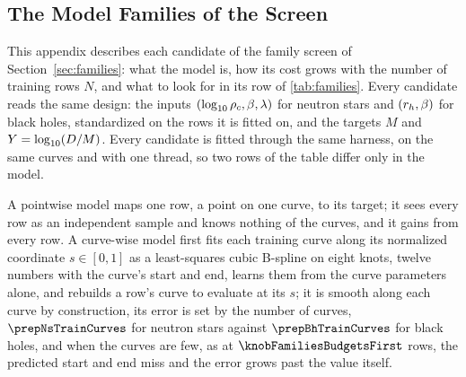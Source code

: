 \subsection{The Model Families of the Screen}
\label{app:families}

This appendix describes each candidate of the family screen of Section~\ref{sec:families}: what the model is, how its cost grows with the number of training rows $N$, and what to look for in its row of \cref{tab:families}. Every candidate reads the same design: the inputs $(\log_{10}\rho_c, \beta, \lambda)$ for neutron stars and $(r_h, \beta)$ for black holes, standardized on the rows it is fitted on, and the targets $M$ and $Y = \log_{10}(D/M)$. Every candidate is fitted through the same harness, on the same curves and with one thread, so two rows of the table differ only in the model.

A pointwise model maps one row, a point on one curve, to its target; it sees every row as an independent sample and knows nothing of the curves, and it gains from every row. A curve-wise model first fits each training curve along its normalized coordinate $s \in [0, 1]$ as a least-squares cubic B-spline on eight knots, twelve numbers with the curve's start and end, learns them from the curve parameters alone, and rebuilds a row's curve to evaluate at its $s$; it is smooth along each curve by construction, its error is set by the number of curves, $\prepNsTrainCurves$ for neutron stars against $\prepBhTrainCurves$ for black holes, and when the curves are few, as at $\knobFamiliesBudgetsFirst$ rows, the predicted start and end miss and the error grows past the value itself.

